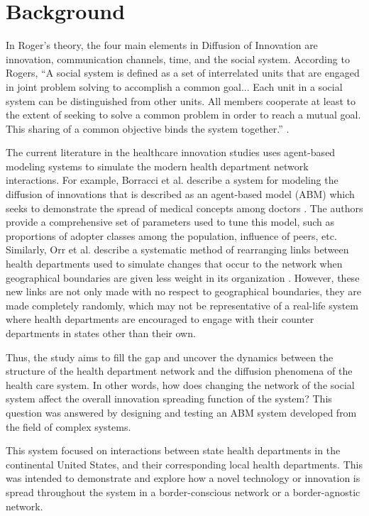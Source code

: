 \documentclass[12pt]{article}
\begin{document}
\section{Background}
In Roger’s theory, the four main elements in Diffusion of Innovation are innovation, communication channels, time, and the social system. According to Rogers, “A social system is defined as a set of interrelated units that are engaged in joint problem solving to accomplish a common goal... Each unit in a social system can be distinguished from other units. All members cooperate at least to the extent of seeking to solve a common problem in order to reach a mutual goal. This sharing of a common objective binds the system together.” \cite{rogers_diffusion_1983}.
\par The current literature in the healthcare innovation studies uses agent-based modeling systems to simulate the modern health department network interactions. For example, Borracci et al. describe a system for modeling the diffusion of innovations that is described as an agent-based model (ABM) which seeks to demonstrate the spread of medical concepts among doctors \cite{borracci_agent-based_2018}. The authors provide a comprehensive set of parameters used to tune this model, such as proportions of adopter classes among the population, influence of peers, etc. Similarly, Orr et al. describe a systematic method of rearranging links between health departments used to simulate changes that occur to the network when geographical boundaries are given less weight in its organization \cite{orr_diffusion_2013}. However, these new links are not only made with no respect to geographical boundaries, they are made completely randomly, which may not be representative of a real-life system where health departments are encouraged to engage with their counter departments in states other than their own.
\par Thus, the study aims to fill the gap and uncover the dynamics between the structure of the health department network and the diffusion phenomena of the health care system. In other words, how does changing the network of the social system affect the overall innovation spreading function of the system?
This question was answered by designing and testing an ABM system developed from the field of complex systems. 
\par This system focused on interactions between state health departments in the continental United States, and their corresponding local health departments. This was intended to demonstrate and explore how a novel technology or innovation is spread throughout the system in a border-conscious network or a border-agnostic network.
\end{document}
